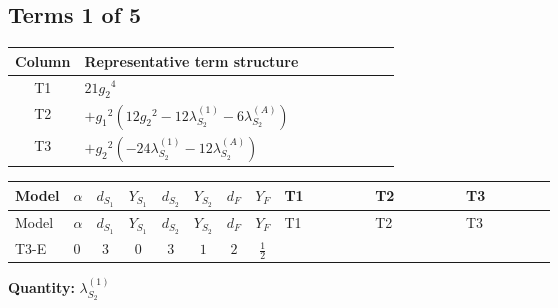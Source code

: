 \documentclass[8pt]{article}
\begin{document}
\begin{landscape}
\subsection*{Terms 1 of 5}
\begin{center}
\begin{tabular}{@{}c >{\raggedright\arraybackslash}p{0.82\linewidth}@{}}
\toprule
Column & Representative term structure \\
\midrule
T1 & \(\displaystyle 21 {g_2}^4\) \\
\midrule
T2 & \(\displaystyle +{g_1}^2 \left(12 {g_2}^2-12 {\lambda_{S_2}^{(1)}}-6 {\lambda_{S_2}^{(A)}}\right)\) \\
\midrule
T3 & \(\displaystyle +{g_2}^2 (-24 {\lambda_{S_2}^{(1)}}-12 {\lambda_{S_2}^{(A)}})\) \\
\midrule
\bottomrule
\end{tabular}
\end{center}
\smallskip
\tiny
\begin{longtable}{@{}llcccccc >{\raggedright\arraybackslash}p{0.21\linewidth} >{\raggedright\arraybackslash}p{0.21\linewidth} >{\raggedright\arraybackslash}p{0.21\linewidth}@{}}
\toprule
Model & $\alpha$ & $d_{S_1}$ & $Y_{S_1}$ & $d_{S_2}$ & $Y_{S_2}$ & $d_F$ & $Y_F$ & T1 & T2 & T3 \\
\midrule
\endfirsthead
\toprule
Model & $\alpha$ & $d_{S_1}$ & $Y_{S_1}$ & $d_{S_2}$ & $Y_{S_2}$ & $d_F$ & $Y_F$ & T1 & T2 & T3 \\
\midrule
\endhead
T3-E & $0$ & $3$ & $0$ & $3$ & $1$ & $2$ & $\frac{1}{2}$ & \scriptsize\adjustbox{max width=\linewidth}{$\begin{gathered} 21 {g_2}^4\end{gathered}$} & \scriptsize\adjustbox{max width=\linewidth}{$\begin{gathered} +{g_1}^2 \left(12 {g_2}^2-12 {\lambda_{S_2}^{(1)}}-6 {\lambda_{S_2}^{(A)}}\right)\end{gathered}$} & \scriptsize\adjustbox{max width=\linewidth}{$\begin{gathered} +{g_2}^2 (-24 {\lambda_{S_2}^{(1)}}-12 {\lambda_{S_2}^{(A)}})\end{gathered}$} \\
\midrule
\bottomrule
\end{longtable}
\clearpage
\noindent\textbf{Quantity: }$\lambda_{S_2}^{(1)}$\par\smallskip

\end{landscape}
\end{document}
